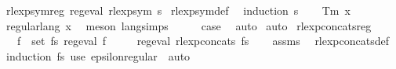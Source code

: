 \begin{isabellebody}
\begin{isamarkuptext}
\end{isamarkuptext}\isamarkuptrue%
\isamarkupfalse%
\ rlexp{\isacharunderscore}{\kern0pt}sym{\isacharunderscore}{\kern0pt}reg{\isacharcolon}{\kern0pt}\ {\isachardoublequoteopen}reg{\isacharunderscore}{\kern0pt}eval\ {\isacharparenleft}{\kern0pt}rlexp{\isacharunderscore}{\kern0pt}sym\ s{\isacharparenright}{\kern0pt}{\isachardoublequoteclose}\isanewline
%
\isadelimproof
%
\endisadelimproof
%
\isatagproof
{}\isamarkupfalse%
\ rlexp{\isacharunderscore}{\kern0pt}sym{\isacharunderscore}{\kern0pt}def\ \isamarkupfalse%
\ {\isacharparenleft}{\kern0pt}induction\ s{\isacharparenright}{\kern0pt}\isanewline
\ \ \isamarkupfalse%
\ {\isacharparenleft}{\kern0pt}Tm\ x{\isacharparenright}{\kern0pt}\isanewline
\ \ \isamarkupfalse%
\ {\isachardoublequoteopen}regular{\isacharunderscore}{\kern0pt}lang\ {\isacharbraceleft}{\kern0pt}{\isacharbrackleft}{\kern0pt}x{\isacharbrackright}{\kern0pt}{\isacharbraceright}{\kern0pt}{\isachardoublequoteclose}\ \isamarkupfalse%
\ {\isacharparenleft}{\kern0pt}meson\ lang{\isachardot}{\kern0pt}simps{\isacharparenleft}{\kern0pt}{}{\isacharparenright}{\kern0pt}{\isacharparenright}{\kern0pt}\isanewline
\ \ \isamarkupfalse%
\ \isamarkupfalse%
\ {\isacharquery}{\kern0pt}case\ \isamarkupfalse%
\ auto\isanewline
{}\isamarkupfalse%
\ auto%
\endisatagproof
{\isafoldproof}%
%
\isadelimproof
\isanewline
%
\endisadelimproof
\isanewline
{}\isamarkupfalse%
\ rlexp{\isacharunderscore}{\kern0pt}concats{\isacharunderscore}{\kern0pt}reg{\isacharcolon}{\kern0pt}\isanewline
\ \ \ {\isachardoublequoteopen}{\isasymforall}f\ {\isasymin}\ set\ fs{\isachardot}{\kern0pt}\ reg{\isacharunderscore}{\kern0pt}eval\ f{\isachardoublequoteclose}\isanewline
\ \ \ \ \ {\isachardoublequoteopen}reg{\isacharunderscore}{\kern0pt}eval\ {\isacharparenleft}{\kern0pt}rlexp{\isacharunderscore}{\kern0pt}concats\ fs{\isacharparenright}{\kern0pt}{\isachardoublequoteclose}\isanewline
%
\isadelimproof
\ \ %
\endisadelimproof
%
\isatagproof
{}\isamarkupfalse%
\ assms\ \isamarkupfalse%
\ rlexp{\isacharunderscore}{\kern0pt}concats{\isacharunderscore}{\kern0pt}def\ \isamarkupfalse%
\ {\isacharparenleft}{\kern0pt}induction\ fs{\isacharparenright}{\kern0pt}\ {\isacharparenleft}{\kern0pt}use\ epsilon{\isacharunderscore}{\kern0pt}regular\ \ auto{\isacharparenright}{\kern0pt}%

\end{isabellebody}
